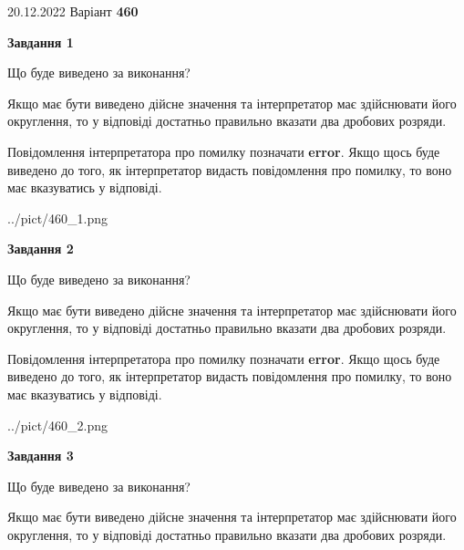 \documentclass[12pt, ukrainian]{article}
\begin{document}
{20.12.2022 Варіант \No \textbf { 460 }\par}
{
\begin {Large}

{\begin {center}\textbf{Завдання 1}\end {center}}\par
Що буде виведено за виконання? \par

Якщо має бути виведено дійсне значення та інтерпретатор має здійснювати його округлення, 
то у відповіді достатньо правильно вказати два дробових розряди.

Повідомлення інтерпретатора про помилку позначати \textbf{error}.
Якщо щось буде виведено до того, як інтерпретатор видасть повідомлення про помилку, 
то воно має вказуватись у відповіді. \par

\begin{center}
	{../pict/460_1.png}
\end{center}
\newpage

{\begin {center}\textbf{Завдання 2}\end {center}}\par
Що буде виведено за виконання? \par

Якщо має бути виведено дійсне значення та інтерпретатор має здійснювати його округлення, 
то у відповіді достатньо правильно вказати два дробових розряди.

Повідомлення інтерпретатора про помилку позначати \textbf{error}.
Якщо щось буде виведено до того, як інтерпретатор видасть повідомлення про помилку, 
то воно має вказуватись у відповіді. \par

\begin{center}
	{../pict/460_2.png}
\end{center}
\newpage

{\begin {center}\textbf{Завдання 3}\end {center}}\par
Що буде виведено за виконання? \par

Якщо має бути виведено дійсне значення та інтерпретатор має здійснювати його округлення, 
то у відповіді достатньо правильно вказати два дробових розряди.


\end{Large}}
\end{document}
